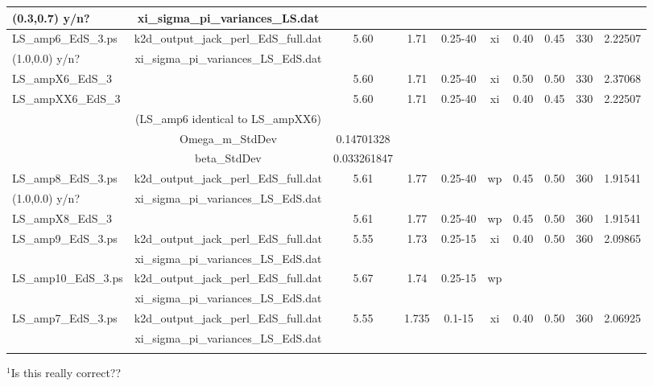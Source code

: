 \documentclass[usenatbib]{mn2e}
\begin{document}
\begin{table}
\begin{center}
\begin{tabular}{lccccccccc}
(0.3,0.7) y/n?	& xi\_sigma\_pi\_variances\_LS.dat          &               &      &         &      &       &       &      & \\[16pt]
%
%	
\hline
%
LS\_amp6\_EdS\_3.ps  & k2d\_output\_jack\_perl\_EdS\_full.dat  & 5.60         & 1.71  & 0.25-40 &  xi  & 0.40  & 0.45  & 330  & 2.22507 \\
(1.0,0.0) y/n?	     &  xi\_sigma\_pi\_variances\_LS\_EdS.dat  &              &       &         &      &       &       &      & \\[8pt]

LS\_ampX6\_EdS\_3    &                                         &  5.60	      & 1.71  & 0.25-40 &  xi  & 0.50  & 0.50  & 330  & 2.37068 \\
LS\_ampXX6\_EdS\_3   & 	                                       &  5.60	      & 1.71  & 0.25-40 &  xi  & 0.40  & 0.45  & 330  & 2.22507 \\
                     & (LS\_amp6 identical to LS\_ampXX6)      &              &       &         &      &       &       &      & \\
		     & Omega\_m\_StdDev                        &  0.14701328  &       &         &      &       &       &      & \\
		     & beta\_StdDev                            &  0.033261847 &       &         &      &       &       &      & \\[8pt]
%
%
LS\_amp8\_EdS\_3.ps  & k2d\_output\_jack\_perl\_EdS\_full.dat  & 5.61         & 1.77  &  0.25-40 &  wp & 0.45  & 0.50  & 360  & 1.91541\\
(1.0,0.0) y/n?	     & xi\_sigma\_pi\_variances\_LS\_EdS.dat   &              &       &          &     &       &       &      & \\[8pt]
%	
LS\_ampX8\_EdS\_3    &                                         & 5.61         & 1.77  &  0.25-40 &  wp & 0.45  & 0.50  & 360  & 1.91541 \\[8pt]
%
%
LS\_amp9\_EdS\_3.ps  & k2d\_output\_jack\_perl\_EdS\_full.dat  & 5.55         & 1.73  &  0.25-15 &  xi & 0.40  & 0.50  & 360  & 2.09865\\
		     &   xi\_sigma\_pi\_variances\_LS\_EdS.dat &              &       &           &     &       &       &      & \\[8pt]
%
%
LS\_amp10\_EdS\_3.ps & k2d\_output\_jack\_perl\_EdS\_full.dat  & 5.67         & 1.74  & 0.25-15  &  wp &       &       &      & \\
		     & xi\_sigma\_pi\_variances\_LS\_EdS.dat   &              &       &          &     &       &       &      & \\[8pt]
%
%
LS\_amp7\_EdS\_3.ps  & k2d\_output\_jack\_perl\_EdS\_full.dat  & 5.55         & 1.735 &   0.1-15 &  xi &  0.40 & 0.50  & 360  &  2.06925 \\
		     & xi\_sigma\_pi\_variances\_LS\_EdS.dat   &              &       &          &     &       &       &      & \\[8pt]
\hline
\hline
\label{}
\end{tabular}
\end{center}
\end{table}
$^1$Is this really correct??
\end{document}
